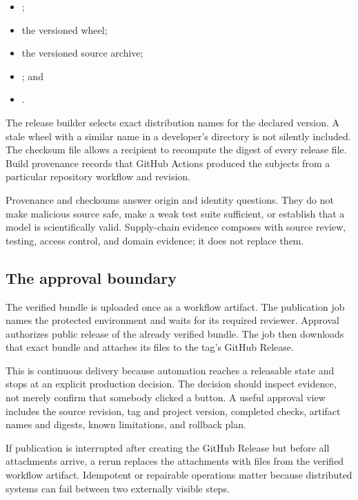 \begin{itemize}
  \item {};
  \item the versioned  wheel;
  \item the versioned  source archive;
  \item {}; and
  \item {}.
\end{itemize}

The release builder selects exact distribution names for the declared version.
A stale wheel with a similar name in a developer's  directory is
not silently included. The checksum file allows a recipient to recompute the
digest of every release file. Build provenance records that GitHub Actions
produced the subjects from a particular repository workflow and revision.

\begin{professionalbox}
Provenance and checksums answer origin and identity questions. They do not make
malicious source safe, make a weak test suite sufficient, or establish that a
model is scientifically valid. Supply-chain evidence composes with source
review, testing, access control, and domain evidence; it does not replace them.
\end{professionalbox}

\subsection{The approval boundary}

The verified bundle is uploaded once as a workflow artifact. The publication
job names the protected  environment and waits for its
required reviewer. Approval authorizes public release of the already verified
bundle. The job then downloads that exact bundle and attaches its files to the
tag's GitHub Release.

This is continuous delivery because automation reaches a releasable state and
stops at an explicit production decision. The decision should inspect evidence,
not merely confirm that somebody clicked a button. A useful approval view
includes the source revision, tag and project version, completed checks,
artifact names and digests, known limitations, and rollback plan.

If publication is interrupted after creating the GitHub Release but before all
attachments arrive, a rerun replaces the attachments with files from the
verified workflow artifact. Idempotent or repairable operations matter because
distributed systems can fail between two externally visible steps.

